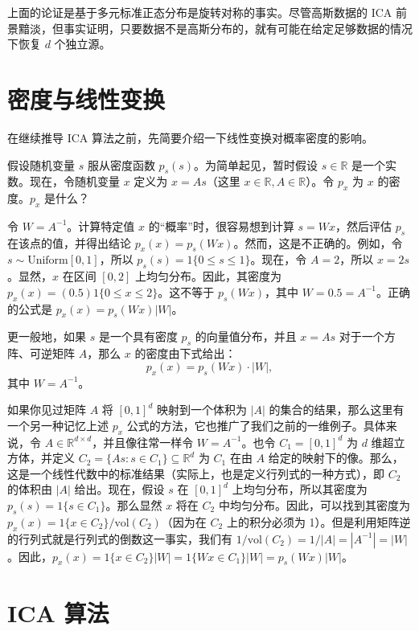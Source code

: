 上面的论证是基于多元标准正态分布是旋转对称的事实。尽管高斯数据的 ICA 前景黯淡，但事实证明，只要数据不是高斯分布的，就有可能在给定足够数据的情况下恢复 $d$ 个独立源。

\section{密度与线性变换}

在继续推导 ICA 算法之前，先简要介绍一下线性变换对概率密度的影响。

假设随机变量 $s$ 服从密度函数 $p_s(s)$。为简单起见，暂时假设 $s \in \mathbb{R}$ 是一个实数。现在，令随机变量 $x$ 定义为 $x = As$（这里 $x \in \mathbb{R}, A \in \mathbb{R}$）。令 $p_x$ 为 $x$ 的密度。$p_x$ 是什么？

令 $W = A^{-1}$。计算特定值 $x$ 的“概率”时，很容易想到计算 $s = Wx$，然后评估 $p_s$ 在该点的值，并得出结论 $p_x(x) = p_s(Wx)$。然而，这是不正确的。例如，令 $s \sim \text{Uniform}[0, 1]$，所以 $p_s(s) = 1\{0 \le s \le 1\}$。现在，令 $A = 2$，所以 $x = 2s$。显然，$x$ 在区间 $[0, 2]$ 上均匀分布。因此，其密度为 $p_x(x) = (0.5)1\{0 \le x \le 2\}$。这不等于 $p_s(Wx)$，其中 $W = 0.5 = A^{-1}$。正确的公式是 $p_x(x) = p_s(Wx)|W|$。

更一般地，如果 $s$ 是一个具有密度 $p_s$ 的向量值分布，并且 $x = As$ 对于一个方阵、可逆矩阵 $A$，那么 $x$ 的密度由下式给出：
\[
    p_x(x) = p_s(Wx) \cdot |W|,
\]
其中 $W = A^{-1}$。

\begin{remark*}
    如果你见过矩阵 $A$ 将 $[0, 1]^d$ 映射到一个体积为 $|A|$ 的集合的结果，那么这里有一个另一种记忆上述 $p_x$ 公式的方法，它也推广了我们之前的一维例子。具体来说，令 $A \in \mathbb{R}^{d \times d}$，并且像往常一样令 $W = A^{-1}$。也令 $C_1 = [0, 1]^d$ 为 $d$ 维超立方体，并定义 $C_2 = \{As : s \in C_1\} \subseteq \mathbb{R}^d$ 为 $C_1$ 在由 $A$ 给定的映射下的像。那么，这是一个线性代数中的标准结果（实际上，也是定义行列式的一种方式），即 $C_2$ 的体积由 $|A|$ 给出。现在，假设 $s$ 在 $[0, 1]^d$ 上均匀分布，所以其密度为 $p_s(s) = 1\{s \in C_1\}$。那么显然 $x$ 将在 $C_2$ 中均匀分布。因此，可以找到其密度为 $p_x(x) = 1\{x \in C_2\}/\text{vol}(C_2)$（因为在 $C_2$ 上的积分必须为 1）。但是利用矩阵逆的行列式就是行列式的倒数这一事实，我们有 $1/\text{vol}(C_2) = 1/|A| = |A^{-1}| = |W|$。因此，$p_x(x) = 1\{x \in C_2\}|W| = 1\{Wx \in C_1\}|W| = p_s(Wx)|W|$。
\end{remark*}

\section{ICA 算法}

